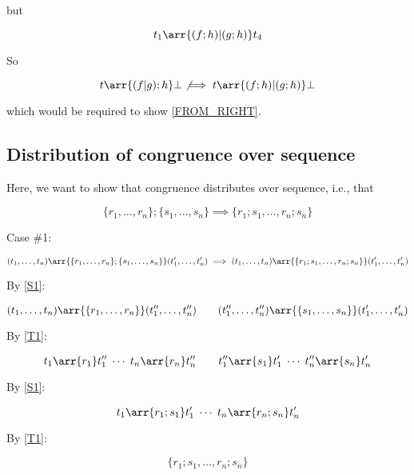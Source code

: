 but

\begin{equation}
t_1 \arr{(f;h)|(g;h)} t_4
\end{equation}

So

\begin{equation}
t \arr{(f|g);h} \bot \not\implies t \arr{(f;h)|(g;h)} \bot
\end{equation}

which would be required to show \eqref{FROM_RIGHT}.


\subsection{Distribution of congruence over sequence}

Here, we want to show that congruence distributes over sequence,
i.e., that

\begin{equation}
\{r_1,\ldots,r_n\};\{s_1,\ldots,s_n\}
\implies
\{r_1;s_1,\ldots,r_n;s_n\}
\end{equation}

Case \#1:

\begin{equation}
(t_1,\ldots,t_n) \arr{\{r_1,\ldots,r_n\};\{s_1,\ldots,s_n\}} (t'_1,\ldots,t'_n) \implies (t_1,\ldots,t_n) \arr{\{r_1;s_1,\ldots,r_n;s_n\}} (t'_1,\ldots,t'_n)
\end{equation}

By \eqref{S1}:

\begin{equation}
(t_1,\ldots,t_n) \arr{\{r_1,\ldots,r_n\}} (t''_1,\ldots,t''_n)
\qquad
(t''_1,\ldots,t''_n) \arr{\{s_1,\ldots,s_n\}} (t'_1,\ldots,t'_n)
\end{equation}

By \eqref{T1}:

\begin{equation}
t_1 \arr{r_1} t''_1
\;\cdots\;
t_n \arr{r_n} t''_n
\qquad
t''_1 \arr{s_1} t'_1
\;\cdots\;
t''_n \arr{s_n} t'_n
\end{equation}

By \eqref{S1}:

\begin{equation}
t_1 \arr{r_1;s_1} t'_1
\;\cdots\;
t_n \arr{r_n;s_n} t'_n
\end{equation}

By \eqref{T1}:

\begin{equation}
\{r_1;s_1,\ldots,r_n;s_n\}
\end{equation}

